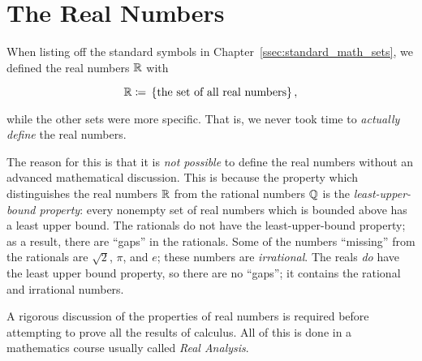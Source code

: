 \section{The Real Numbers}

When listing off the standard symbols in Chapter~\ref{ssec:standard_math_sets},
we defined the real numbers $\mathbb{R}$ with

\begin{equation}
    \mathbb{R} \coloneqq{} \left\{ \text{the set of all real numbers} \right\},
\end{equation}

\noindent
while the other sets were more specific.
That is, we never took time to \emph{actually define} the real numbers.

The reason for this is that it is \emph{not possible} to define
the real numbers without an advanced mathematical discussion.
This is because the property which distinguishes the real numbers $\mathbb{R}$ from
the rational numbers $\mathbb{Q}$ is the \emph{least-upper-bound property}:
every nonempty set of real numbers which is bounded above has a
least upper bound.
The rationals do not have the least-upper-bound property;
as a result, there are ``gaps'' in the rationals.
Some of the numbers ``missing'' from the rationals are $\sqrt{2}$, $\pi$,
and $e$; these numbers are \emph{irrational}.
The reals \emph{do} have the least upper bound property,
so there are no ``gaps'';
it contains the rational and irrational numbers.

A rigorous discussion of the properties of real numbers is required
before attempting to prove all the results of calculus.
All of this is done in a mathematics course usually called
\emph{Real Analysis}.
